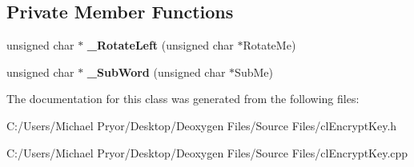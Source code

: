 \subsection*{Private Member Functions}
\begin{DoxyCompactItemize}
\item 
\hypertarget{classcl_encrypt_key_a8cb5932da82a4ba09ef2bfdf80fefa37}{
unsigned char $\ast$ {\bfseries \_\-RotateLeft} (unsigned char $\ast$RotateMe)}
\label{classcl_encrypt_key_a8cb5932da82a4ba09ef2bfdf80fefa37}

\item 
\hypertarget{classcl_encrypt_key_a795bbe3903912be9c2d14ed468f77900}{
unsigned char $\ast$ {\bfseries \_\-SubWord} (unsigned char $\ast$SubMe)}
\label{classcl_encrypt_key_a795bbe3903912be9c2d14ed468f77900}

\end{DoxyCompactItemize}


The documentation for this class was generated from the following files:\begin{DoxyCompactItemize}
\item 
C:/Users/Michael Pryor/Desktop/Deoxygen Files/Source Files/clEncryptKey.h\item 
C:/Users/Michael Pryor/Desktop/Deoxygen Files/Source Files/clEncryptKey.cpp\end{DoxyCompactItemize}
